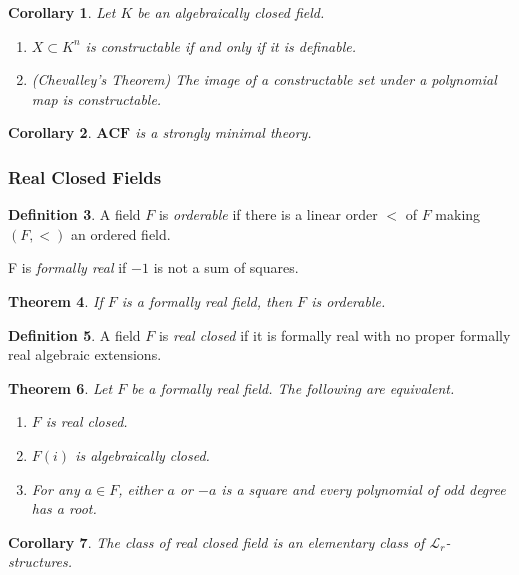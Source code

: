 \documentclass{amsart}
\newtheorem{theorem}{Theorem}[subsection]
\newtheorem{corollary}[theorem]{Corollary}
\theoremstyle{definition}
\newtheorem{definition}[theorem]{Definition}
\numberwithin{equation}{section}
\begin{document}
\begin{corollary}
  Let $K$ be an algebraically closed field.
  \begin{enumerate}[label = {\roman*)}]
    \item $X \subset K^n$ is constructable if and only if it is definable.
    \item (Chevalley's Theorem) The image of a constructable set under a polynomial map is constructable.
  \end{enumerate}
\end{corollary}

\begin{corollary}
  $\mathbf{ACF}$ is a strongly minimal theory.
\end{corollary}

\subsubsection{Real Closed Fields}

\begin{definition}
  A field $F$ is \emph{orderable} if there is a linear order $<$ of $F$ making $(F,<)$ an ordered field.

  F is \emph{formally real} if $-1$ is not a sum of squares.
\end{definition}

\begin{theorem}
  If $F$ is a formally real field, then $F$ is orderable.
\end{theorem}

\begin{definition}
  A field $F$ is \emph{real closed} if it is formally real with no proper formally real algebraic extensions.
\end{definition}

\begin{theorem}
  Let $F$ be a formally real field. The following are equivalent.
  \begin{enumerate}[label = {\roman*)}]
    \item $F$ is real closed.
    \item $F(i)$ is algebraically closed.
    \item For any $a\in F$, either $a$ or $-a$ is a square and every polynomial of odd degree has a root.
  \end{enumerate}
\end{theorem}

\begin{corollary}
  The class of real closed field is an elementary class of
  $\mathcal{L}_r$-structures.
\end{corollary}
\end{document}
